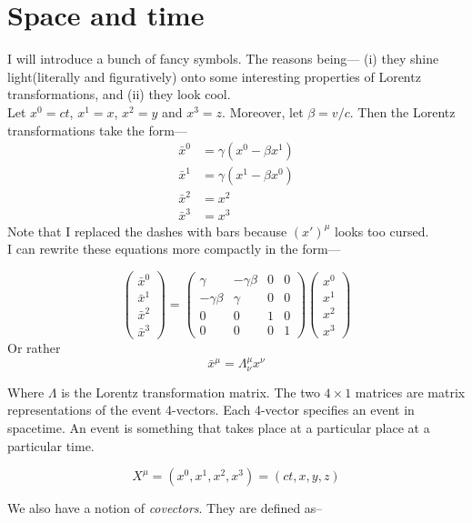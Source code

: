 \documentclass[12pt]{article}
\begin{document}
\section{Space and time}
I will introduce a bunch of fancy symbols. The reasons being--- (i) they shine light(literally and figuratively) onto some interesting properties 
of Lorentz transformations, and (ii) they look cool. \\
Let $x^0 = ct$, $x^1 = x$, $x^2=y$ and $x^3 = z$. Moreover, let $\beta = v/c$. Then the Lorentz transformations take the form---
\[
\begin{aligned}
    \bar{x}^0 &= \gamma(x^0 - \beta x^1)\\
    \bar{x}^1 &= \gamma(x^1 - \beta x^0)\\
    \bar{x}^2 &= x^2\\
    \bar{x}^3 &= x^3
\end{aligned}
\]
Note that I replaced the dashes with bars because $(x')^{\mu}$ looks too cursed. \\
I can rewrite these equations more compactly in the form---

\[
\begin{pmatrix}
\bar{x}^0\\
\bar{x}^1\\
\bar{x}^2\\
\bar{x}^3
\end{pmatrix}
=
\begin{pmatrix}
\gamma & -\gamma\beta & 0 & 0\\
-\gamma\beta & \gamma & 0 & 0\\
0 & 0 & 1 & 0\\
0 & 0 & 0 & 1
\end{pmatrix}
\begin{pmatrix}
x^0\\
x^1\\
x^2\\
x^3
\end{pmatrix}
\]
Or rather 
\[\bar{x}^{\mu} = \Lambda^{\mu}_{\nu}x^{\nu}\]

Where $\Lambda$ is the Lorentz transformation matrix. The two $4\times 1$ matrices are matrix representations of the event 4-vectors. 
Each 4-vector specifies an event in spacetime. An event is something that takes place at a particular place at a particular time. 

\[X^{\mu} = (x^0,x^1,x^2,x^3) = (ct, x, y, z)\]

We also have a notion of \textit{covectors}. They are defined as-- 
\end{document}
